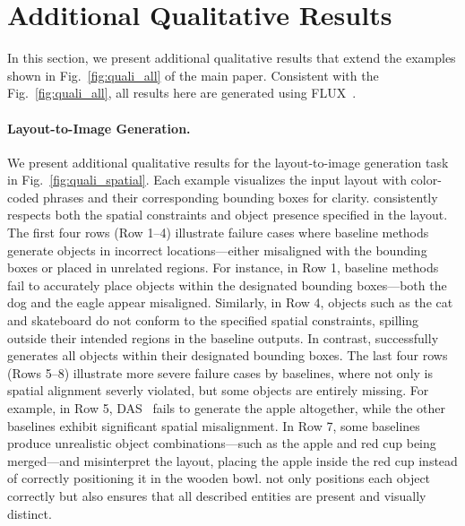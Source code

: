 \section{Additional Qualitative Results}
\label{sec:appx:additional qualitative}
In this section, we present additional qualitative results that extend the examples shown in Fig.~\ref{fig:quali_all} of the main paper. Consistent with the Fig.~\ref{fig:quali_all}, all results here are generated using FLUX~\cite{BlackForestLabs:2024Flux}.

\paragraph{Layout-to-Image Generation.}
We present additional qualitative results for the layout-to-image generation task in Fig.~\ref{fig:quali_spatial}. Each example visualizes the input layout with color-coded phrases and their corresponding bounding boxes for clarity. \methodname{} consistently respects both the spatial constraints and object presence specified in the layout. The first four rows (Row 1–4) illustrate failure cases where baseline methods generate objects in incorrect locations---either misaligned with the bounding boxes or placed in unrelated regions. 
For instance, in Row 1, baseline methods fail to accurately place objects within the designated bounding boxes—both the dog and the eagle appear misaligned. Similarly, in Row 4, objects such as the cat and skateboard do not conform to the specified spatial constraints, spilling outside their intended regions in the baseline outputs.  
In contrast, \methodname{} successfully generates all objects within their designated bounding boxes. The last four rows (Rows 5–8) illustrate more severe failure cases by baselines, where not only is spatial alignment severly violated, but some objects are entirely missing. For example, in Row 5, DAS~\cite{kim2025DAS} fails to generate the apple altogether, while the other baselines exhibit significant spatial misalignment. In Row 7, some baselines produce unrealistic object combinations—such as the apple and red cup being merged—and misinterpret the layout, placing the apple inside the red cup instead of correctly positioning it in the wooden bowl.
\methodname{} not only positions each object correctly but also ensures that all described entities are present and visually distinct.

